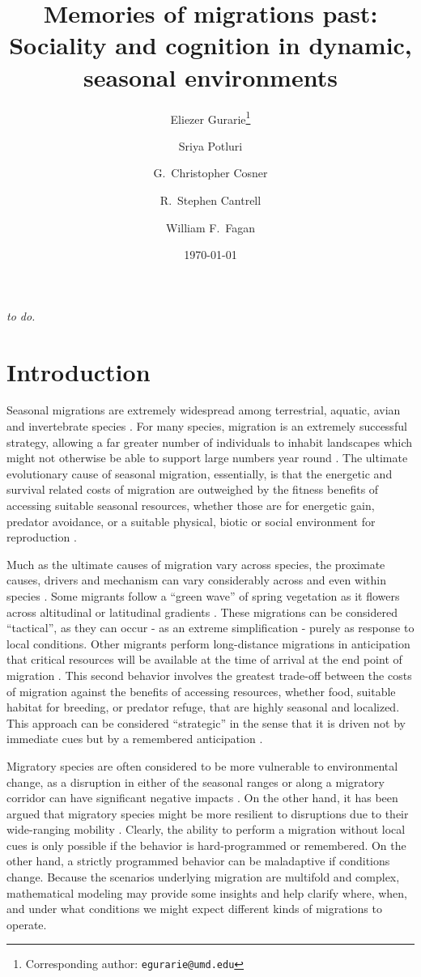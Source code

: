 \documentclass[12pt]{article}
\title{Memories of migrations past: Sociality and cognition in dynamic,
seasonal environments}
\author[a,b]{Eliezer Gurarie\footnote{Corresponding author: \texttt{egurarie@umd.edu}}}
\author[a]{Sriya Potluri}
\author[c]{G.~Christopher Cosner}
\author[c]{R.~Stephen Cantrell}
\author[a,b]{William F.~Fagan}
\affil[a]{\,\, Department of Biology, University of Maryland, College Park, MD 20742, USA.}
\affil[b]{\,\,Socio-Economic Synthesis Center, SESYNC, Annapolis, MD, USA.}
\affil[c]{\,\,Department of Mathematics, The University of Miami, Coral Gables, FL 33146}
\date{\today}
\begin{document}
\onehalfspacing

\maketitle

\linenumbers

\abstract

\emph{to do.}

\section{Introduction}

Seasonal migrations are extremely widespread among terrestrial, aquatic, avian and invertebrate species \citep{Dingle2014}. For many species, migration is an extremely successful strategy, allowing a far greater number of individuals to inhabit landscapes which might not otherwise be able to support large numbers year round \citep{Fryxell1988}. The ultimate evolutionary cause of seasonal migration, essentially, is that the energetic and survival related costs of migration are outweighed by the fitness benefits of accessing suitable seasonal resources, whether those are for energetic gain, predator avoidance, or a suitable physical, biotic or social environment for reproduction \citep{Avgar2014}.

Much as the ultimate causes of migration vary across species, the proximate causes, drivers and mechanism can vary considerably across and even within species \citep{Berthold1999, Shaw2016}. Some migrants follow a ``green wave'' of spring vegetation as it flowers across altitudinal or latitudinal gradients \citep{Bischof2012, Kolzsch2015}. These migrations can be considered ``tactical'', as they can occur - as an extreme simplification - purely as response to local conditions. Other migrants perform long-distance migrations in anticipation that critical resources will be available at the time of arrival at the end point of migration \citep{Abrahms2019}. This second behavior involves the greatest trade-off between the costs of migration against the benefits of accessing resources, whether food, suitable habitat for breeding, or predator refuge, that are highly seasonal and localized. This approach can be considered ``strategic'' in the sense that it is driven not by immediate cues but by a remembered anticipation \citep{Bracis2017}.

Migratory species are often considered to be more vulnerable to environmental change, as a disruption in either of the seasonal ranges or along a migratory corridor can have significant negative impacts \citep{Wilcove2008, Kauffman2021}. On the other hand, it has been argued that migratory species might be more resilient to disruptions due to their wide-ranging mobility \citep{Robinson2009}. Clearly, the ability to perform a migration without local cues is only possible if the behavior is hard-programmed or remembered. On the other hand, a strictly programmed behavior can be maladaptive if conditions change. Because the scenarios underlying migration are multifold and complex, mathematical modeling may provide some insights and help clarify where, when, and under what conditions we might expect different kinds of migrations to operate.
\end{document}
